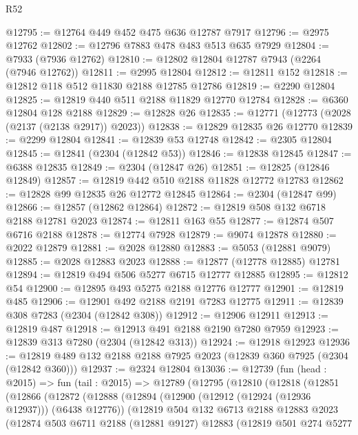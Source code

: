 \begin{lexlean}{R52}
\begin{coremodule}
@12795 := @12764 @449 @452 @475 @636 @12787 @7917
@12796 := @2975 @12762
@12802 := @12796 @7883 @478 @483 @513 @635 @7929
@12804 := @7933 (@7936 @12762)
@12810 := @12802 @12804 @12787 @7943 (@2264 (@7946 @12762))
@12811 := @2995 @12804
@12812 := @12811 @152
@12818 := @12812 @118 @512 @11830 @2188 @12785 @12786
@12819 := @2290 @12804
@12825 := @12819 @440 @511 @2188 @11829 @12770 @12784
@12828 := @6360 @12804 @128 @2188
@12829 := @12828 @26
@12835 := @12771 (@12773 (@2028 (@2137 (@2138 @2917)) @2023))
@12838 := @12829 @12835 @26 @12770
@12839 := @2299 @12804
@12841 := @12839 @53 @12748
@12842 := @2305 @12804
@12845 := @12841 (@2304 (@12842 @53))
@12846 := @12838 @12845
@12847 := @6388 @12835
@12849 := @2304 (@12847 @26)
@12851 := @12825 (@12846 @12849)
@12857 := @12819 @442 @510 @2188 @11828 @12772 @12783
@12862 := @12828 @99 @12835 @26 @12772 @12845
@12864 := @2304 (@12847 @99)
@12866 := @12857 (@12862 @12864)
@12872 := @12819 @508 @132 @6718 @2188 @12781 @2023
@12874 := @12811 @163 @55
@12877 := @12874 @507 @6716 @2188
@12878 := @12774 @7928
@12879 := @9074 @12878
@12880 := @2022 @12879
@12881 := @2028 @12880
@12883 := @5053 (@12881 @9079)
@12885 := @2028 @12883 @2023
@12888 := @12877 (@12778 @12885) @12781
@12894 := @12819 @494 @506 @5277 @6715 @12777 @12885
@12895 := @12812 @54
@12900 := @12895 @493 @5275 @2188 @12776 @12777
@12901 := @12819 @485
@12906 := @12901 @492 @2188 @2191 @7283 @12775
@12911 := @12839 @308 @7283 (@2304 (@12842 @308))
@12912 := @12906 @12911
@12913 := @12819 @487
@12918 := @12913 @491 @2188 @2190 @7280 @7959
@12923 := @12839 @313 @7280 (@2304 (@12842 @313))
@12924 := @12918 @12923
@12936 := @12819 @489 @132 @2188 @2188 @7925 @2023 (@12839 @360 @7925 (@2304 (@12842 @360)))
@12937 := @2324 @12804
@13036 := @12739
    (fun (head : @2015) =>
    fun (tail : @2015) =>
    @12789
      (@12795
        (@12810
          (@12818
            (@12851
              (@12866
                (@12872
                  (@12888
                    (@12894
                      (@12900 (@12912 (@12924 (@12936 @12937))) (@6438 @12776))
                      (@12819
                        @504
                        @132
                        @6713
                        @2188
                        @12883
                        @2023
                        (@12874
                          @503
                          @6711
                          @2188
                          (@12881 @9127)
                          @12883
                          (@12819
                            @501
                            @274
                            @5277

\end{coremodule}
\end{lexlean}
